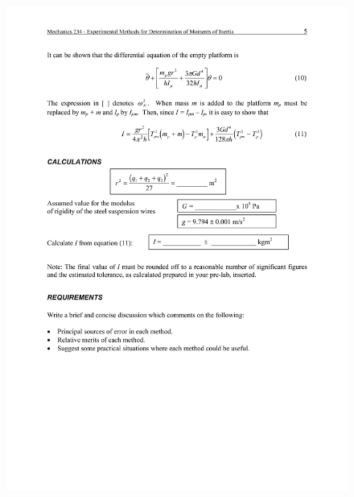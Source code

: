\documentclass[12pt,a4paper]{report}
\begin{document}
\begin{figure}
 \includegraphics[width=\linewidth]{lab1/lab1-5}
  \caption*{}
\label{}
\end{figure}
\end{document}
